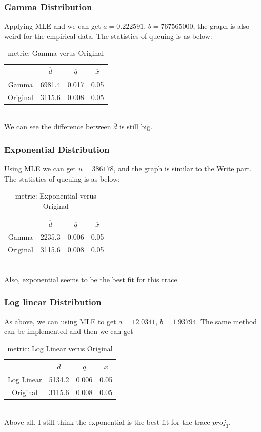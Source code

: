 \documentclass[11pt]{article}
\begin{document}
\subsubsection{Gamma Distribution}
Applying MLE and we can get $a=0.222591$, $b=767565000$, the graph is also weird for the empirical data. The statistics of queuing is as below:
\begin{table}[htdp]
\caption{metric: Gamma verus Original}
\begin{center}
\begin{tabular}{c|c|c|c}
	& $\overline{d}$ & $\overline{q}$ & $\overline{x}$ \\
\hline
Gamma & 6981.4 & 0.017 & 0.05 \\
\hline
Original &3115.6 & 0.008 & 0.05
\end{tabular}
\end{center}
\label{default}
\end{table}%
\\
We can see the difference between $\overline{d}$ is still big.
\subsubsection{Exponential Distribution}
Using MLE we can get $u=386178$, and the graph is similar to the Write part. The statistics of queuing is as below:
\begin{table}[htdp]
\caption{metric: Exponential verus Original}
\begin{center}
\begin{tabular}{c|c|c|c}
	& $\overline{d}$ & $\overline{q}$ & $\overline{x}$ \\
\hline
Gamma & 2235.3& 0.006 & 0.05 \\
\hline
Original &3115.6 & 0.008 & 0.05
\end{tabular}
\end{center}
\label{default}
\end{table}%
\\
Also, exponential seems to be the best fit for this trace.
\subsubsection{Log linear Distribution}
As above, we can using MLE to get $a=12.0341$, $b=1.93794$. The same method can be implemented and then we can get 
\begin{table}[htdp]
\caption{metric: Log Linear verus Original}
\begin{center}
\begin{tabular}{c|c|c|c}
	& $\overline{d}$ & $\overline{q}$ & $\overline{x}$ \\
\hline
Log Linear & 5134.2& 0.006 & 0.05 \\
\hline
Original &3115.6 & 0.008 & 0.05
\end{tabular}
\end{center}
\label{default}
\end{table}%
\\
Above all, I still think the exponential is the best fit for the trace $proj_3$.
\end{document}
